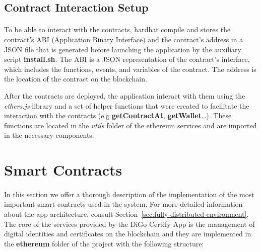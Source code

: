 \subsection{Contract Interaction Setup}\label{subsec:interacting-with-the-contracts}
\paragraph{}

To be able to interact with the contracts, hardhat compile and stores the contract's ABI (Application Binary Interface) and the contract's address in a JSON file that is generated before launching the application by the auxiliary script \textbf{install.sh}.
The ABI is a JSON representation of the contract's interface, which includes the functions, events, and variables of the contract. The address is the location of the contract on the blockchain.

After the contracts are deployed, the application interact with them using the \textit{ethers.js} library and a set of helper functions that were created to facilitate the interaction with the contracts (e.g \textbf{getContractAt}, \textbf{getWallet}\dots).
These functions are located in the \textit{utils} folder of the ethereum services and are imported in the necessary components.

\section{Smart Contracts}\label{sec:smart-contracts-implementation}
\paragraph{}

In this section we offer a thorough description of the implementation of the most important smart contracts used in the system. For more detailed information about the app architecture, consult Section~\ref{sec:fully-distributed-environment}.
The core of the services provided by the DiGo Certify App is the management of digital identities and certificates on the blockchain and they are implemented in the \textbf{ethereum} folder of the project with the following structure:

